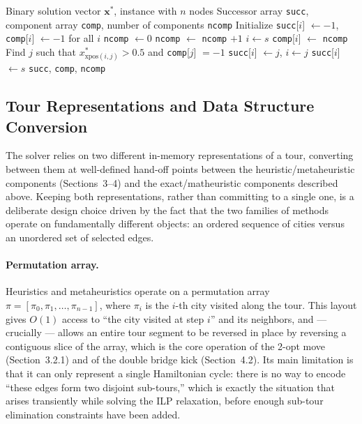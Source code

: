 \documentclass{article}
\begin{document}
\begin{algorithm}[H]
\caption{Tour Reconstruction from ILP Solution (\texttt{build\_sol})}
\label{alg:build_sol}
\begin{algorithmic}[1]
\Require Binary solution vector $\mathbf{x}^*$, instance with $n$ nodes
\Ensure Successor array \texttt{succ}, component array \texttt{comp}, number of components \texttt{ncomp}
\State Initialize \texttt{succ}[$i$] $\leftarrow -1$, \texttt{comp}[$i$] $\leftarrow -1$ for all $i$
\State \texttt{ncomp} $\leftarrow 0$
    \State \texttt{ncomp} $\leftarrow$ \texttt{ncomp} $+ 1$
    \State $i \leftarrow s$
    \Repeat
        \State \texttt{comp}[$i$] $\leftarrow$ \texttt{ncomp}
        \State Find $j$ such that $x^*_{\text{xpos}(i,j)} > 0.5$ and \texttt{comp}[$j$] $= -1$
        \State \texttt{succ}[$i$] $\leftarrow j$, $i \leftarrow j$
    \State \texttt{succ}[$i$] $\leftarrow s$ 
\EndFor
\State \Return \texttt{succ}, \texttt{comp}, \texttt{ncomp}
\end{algorithmic}
\end{algorithm}

\subsection{Tour Representations and Data Structure Conversion}

The solver relies on two different in-memory representations of a tour, converting between
them at well-defined hand-off points between the heuristic/metaheuristic components
(Sections~3--4) and the exact/matheuristic components described above. Keeping both
representations, rather than committing to a single one, is a deliberate design choice driven
by the fact that the two families of methods operate on fundamentally different objects: an
ordered sequence of cities versus an unordered set of selected edges.

\paragraph{Permutation array.}
Heuristics and metaheuristics operate on a permutation array
$\pi = [\pi_0, \pi_1, \ldots, \pi_{n-1}]$, where $\pi_i$ is the $i$-th city visited along the
tour. This layout gives $O(1)$ access to ``the city visited at step $i$'' and its neighbors,
and --- crucially --- allows an entire tour segment to be reversed in place by reversing a
contiguous slice of the array, which is the core operation of the 2-opt move
(Section~3.2.1) and of the double bridge kick (Section~4.2). Its main limitation is that it can
only represent a single Hamiltonian cycle: there is no way to encode ``these edges form two
disjoint sub-tours,'' which is exactly the situation that arises transiently while solving the
ILP relaxation, before enough sub-tour elimination constraints have been added.
\end{document}
